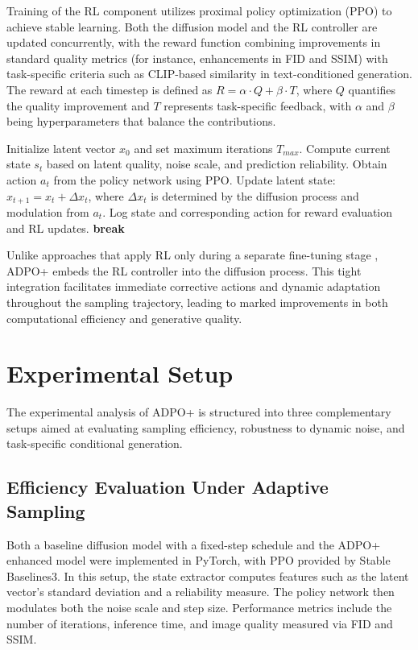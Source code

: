 \documentclass{article} %
\begin{document}
Training of the RL component utilizes proximal policy optimization (PPO) to achieve stable learning. Both the diffusion model and the RL controller are updated concurrently, with the reward function combining improvements in standard quality metrics (for instance, enhancements in FID and SSIM) with task-specific criteria such as CLIP-based similarity in text-conditioned generation. The reward at each timestep is defined as \(R = \alpha \cdot Q + \beta \cdot T\), where \(Q\) quantifies the quality improvement and \(T\) represents task-specific feedback, with \(\alpha\) and \(\beta\) being hyperparameters that balance the contributions.

\begin{algorithm}[H]
\caption{ADPO+ Reverse Diffusion Algorithm}
\begin{algorithmic}
  \State Initialize latent vector \(x_0\) and set maximum iterations \(T_{max}\).
    \State Compute current state \(s_t\) based on latent quality, noise scale, and prediction reliability.
    \State Obtain action \(a_t\) from the policy network using PPO.
    \State Update latent state: \(x_{t+1} = x_t + \Delta x_t\), where \(\Delta x_t\) is determined by the diffusion process and modulation from \(a_t\).
    \State Log state and corresponding action for reward evaluation and RL updates.
      \State \textbf{break}
    \EndIf
  \EndFor
\end{algorithmic}
\end{algorithm}

Unlike approaches that apply RL only during a separate fine-tuning stage \citep{black_2023_training}, ADPO+ embeds the RL controller into the diffusion process. This tight integration facilitates immediate corrective actions and dynamic adaptation throughout the sampling trajectory, leading to marked improvements in both computational efficiency and generative quality.

\section{Experimental Setup}
\label{sec:experimental}
The experimental analysis of ADPO+ is structured into three complementary setups aimed at evaluating sampling efficiency, robustness to dynamic noise, and task-specific conditional generation.

\subsection{Efficiency Evaluation Under Adaptive Sampling}
Both a baseline diffusion model with a fixed-step schedule and the ADPO+ enhanced model were implemented in PyTorch, with PPO provided by Stable Baselines3. In this setup, the state extractor computes features such as the latent vector's standard deviation and a reliability measure. The policy network then modulates both the noise scale and step size. Performance metrics include the number of iterations, inference time, and image quality measured via FID and SSIM.
\end{document}
